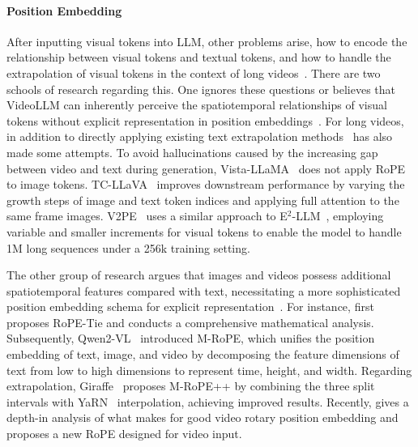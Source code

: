 \paragraph{Position Embedding} After inputting visual tokens into LLM, other problems arise, how to encode the relationship between visual tokens and textual tokens, and how to handle the extrapolation of visual tokens in the context of long videos~\citep{kexuefm10040,wang2024qwen2,li2024giraffe}. There are two schools of research regarding this. One ignores these questions or believes that VideoLLM can inherently perceive the spatiotemporal relationships of visual tokens without explicit representation in position embeddings~\citep{liu2024world,zhang2024llavanextvideo,chen2024internvl}. For long videos, in addition to directly applying existing text extrapolation methods~\citep{liu2024world,zhang2024llavanextvideo,shang2024intp} has also made some attempts. To avoid hallucinations caused by the increasing gap between video and text during generation, Vista-LLaMA~\citep{ma2023vista} does not apply RoPE to image tokens. TC-LLaVA~\citep{gao2024tc} improves downstream performance by varying the growth steps of image and text token indices and applying full attention to the same frame images. V2PE~\citep{ge2024v2pe} uses a similar approach to E$^2$-LLM~\citep{liu20242}, employing variable and smaller increments for visual tokens to enable the model to handle 1M long sequences under a 256k training setting.

The other group of research argues that images and videos possess additional spatiotemporal features compared with text, necessitating a more sophisticated position embedding schema for explicit representation~\citep{kexuefm10040,wang2024qwen2,li2024giraffe}. For instance, \citet{kexuefm10040} first proposes RoPE-Tie and conducts a comprehensive mathematical analysis. Subsequently, Qwen2-VL~\citep{wang2024qwen2} introduced M-RoPE, which unifies the position embedding of text, image, and video by decomposing the feature dimensions of text from low to high dimensions to represent time, height, and width. Regarding extrapolation, Giraffe~\citep{li2024giraffe} proposes M-RoPE++ by combining the three split intervals with YaRN~\citep{pengyarn} interpolation, achieving improved results. Recently, \citet{wei2025videorope} gives a depth-in analysis of what makes for good video rotary position embedding and proposes a new RoPE designed for video input.


